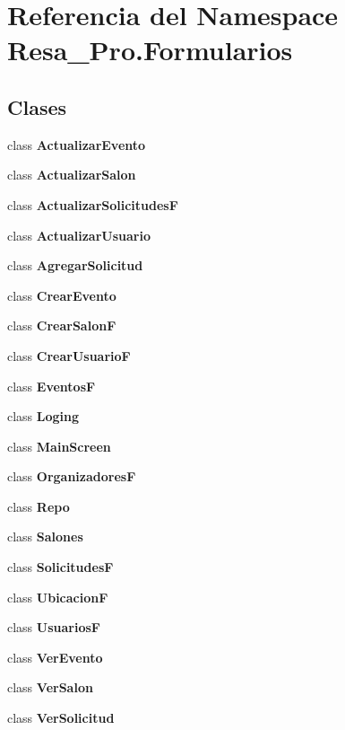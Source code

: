 \section{Referencia del Namespace Resa\+\_\+\+Pro.\+Formularios}
\label{namespace_resa___pro_1_1_formularios}
\subsection*{Clases}
\begin{DoxyCompactItemize}
\item 
class {\bf Actualizar\+Evento}
\item 
class {\bf Actualizar\+Salon}
\item 
class {\bf Actualizar\+SolicitudesF}
\item 
class {\bf Actualizar\+Usuario}
\item 
class {\bf Agregar\+Solicitud}
\item 
class {\bf Crear\+Evento}
\item 
class {\bf Crear\+SalonF}
\item 
class {\bf Crear\+UsuarioF}
\item 
class {\bf EventosF}
\item 
class {\bf Loging}
\item 
class {\bf Main\+Screen}
\item 
class {\bf OrganizadoresF}
\item 
class {\bf Repo}
\item 
class {\bf Salones}
\item 
class {\bf SolicitudesF}
\item 
class {\bf UbicacionF}
\item 
class {\bf UsuariosF}
\item 
class {\bf Ver\+Evento}
\item 
class {\bf Ver\+Salon}
\item 
class {\bf Ver\+Solicitud}
\end{DoxyCompactItemize}
